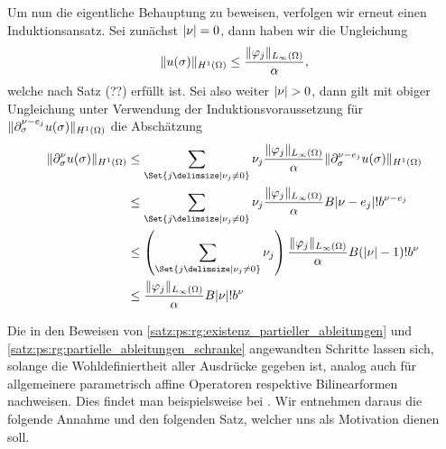 \begin{Satz}
\begin{Beweis}
        Um nun die eigentliche Behauptung zu beweisen, verfolgen wir erneut einen Induktionsansatz.
        Sei zunächst $\lvert\nu\rvert = 0$, dann haben wir die Ungleichung
        \begin{equation}
            \lVert u(\sigma)\rVert_{H^{1}(\Omega)} \leq \frac{\lVert\varphi_{j}\rVert_{L_{\infty}(\Omega)}}{\alpha},
        \end{equation}
        welche nach Satz (??) erfüllt ist.
        Sei also weiter $\lvert\nu\rvert > 0$, dann gilt mit obiger Ungleichung unter Verwendung der Induktionsvoraussetzung für $\lVert\partial^{\nu - e_{j}}_{\sigma} u(\sigma)\rVert_{H^{1}(\Omega)}$ die Abschätzung
        \begin{align}
            \norm{\partial^{\nu}_{\sigma} u(\sigma)}_{H^{1}(\Omega)}
            &\leq
            \sum_{\Set{j \given \nu_{j} \neq 0}} \nu_{j} \frac{\norm{\varphi_{j}}_{L_{\infty}(\Omega)}}{\alpha} \norm{\partial^{\nu - e_{j}}_{\sigma} u(\sigma)}_{H^{1}(\Omega)}
            \\&\leq
            \sum_{\Set{j \given \nu_{j} \neq 0}} \nu_{j} \frac{\norm{\varphi_{j}}_{L_{\infty}(\Omega)}}{\alpha} B \abs{\nu - e_{j}}! b^{\nu - e_{j}}
            \\&\leq
            \left( \sum_{\Set{j \given \nu_{j} \neq 0}} \nu_{j} \right)  \frac{\norm{\varphi_{j}}_{L_{\infty}(\Omega)}}{\alpha} B (\abs{\nu} - 1)! b^{\nu}
            \\&\leq
            \frac{\norm{\varphi_{j}}_{L_{\infty}(\Omega)}}{\alpha} B \abs{\nu}! b^{\nu}
         \end{align}
    \end{Beweis}
\end{Satz}


Die in den Beweisen von \cref{satz:ps:rg:existenz_partieller_ableitungen} und \cref{satz:ps:rg:partielle_ableitungen_schranke} angewandten Schritte lassen sich, solange die Wohldefiniertheit aller Ausdrücke gegeben ist, analog auch für allgemeinere parametrisch affine Operatoren respektive Bilinearformen nachweisen.
Dies findet man beispielsweise bei \textcite{Kunoth:2013ef}.
Wir entnehmen daraus die folgende Annahme und den folgenden Satz, welcher uns als Motivation dienen soll.


